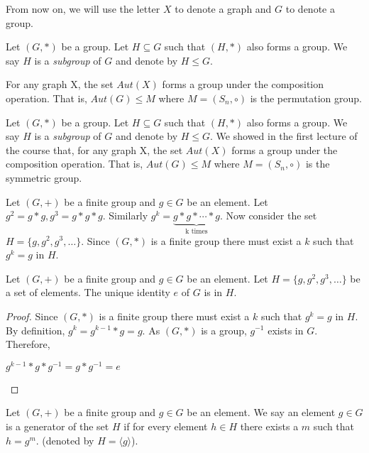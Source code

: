 From now on, we will use the letter $X$ to denote a graph and $G$ to denote a group.

\begin{remark} 
Let $(G,*)$ be a group. Let $H\subseteq G$ such that $(H,*)$ also forms a group. We say $H$ is a {\em subgroup} of $G$ and denote by $H\leq G$.   
\end{remark}


\begin{exercise}
For any graph X, the set $Aut(X)$ forms a group under the composition operation. That is, $Aut(G)\leq M$ where $M=(S_n,\circ)$ is the permutation group.
\end{exercise}

Let $(G,*)$ be a group. Let $H\subseteq G$ such that $(H,*)$ also forms a group. We say $H$ is a {\em subgroup} of $G$ and denote by $H\leq G$. We showed in the first lecture of the course that, for any graph X, the set $Aut(X)$ forms a group under the composition operation. That is, $Aut(G)\leq M$ where $M=(S_n,\circ)$ is the symmetric group.


Let $(G,+)$ be a finite group and $g\in G$ be an element. Let $g^2 =  g*g ,g^3 =  g*g*g $. Similarly $g^k = \underbrace{g*g*\cdots * g}_\text{k times}$. Now consider the set $H=  \{g,g^2,g^3,\ldots\}$. Since $(G,*)$ is a finite group there must exist a $k$ such that $g^k=g$ in $H$.

\begin{lemma}
Let $(G,+)$ be a finite group and $g\in G$ be an element. Let $H=\{g,g^2,g^3,\ldots\}$ be a set of elements. The unique identity $e$ of $G$ is in $H$.
\end{lemma}
\begin{proof}
Since $(G,*)$ is a finite group there must exist a $k$ such that $g^k=g$ in $H$. By definition, $g^k = g^{k-1}*g = g$. As $(G,*)$ is a group, $g^{-1}$ exists in $G$.\\
Therefore,
\begin{center}
$g^{k-1}*g*g^{-1} = g*g^{-1} = e$ 
\end{center}
\end{proof}


\begin{definition}
Let $(G,+)$ be a finite group and $g\in G$ be an element. We say an element $g\in G$ is a generator of the set $H$ if for every element $h\in H$ there exists a $m$ such that $h=g^m$.  (denoted by $H=\langle g \rangle$).
\end{definition}

